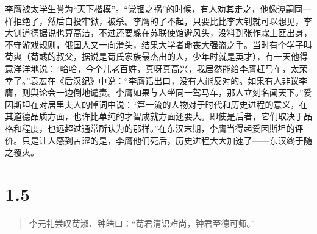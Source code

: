 \documentclass[]{book}
\begin{document}
李膺被太学生誉为``天下楷模''。``党锢之祸''的时候，有人劝其走之，他像谭嗣同一样拒绝了，然后自投牢狱，被杀。李膺的了不起，只要比比李大钊就可以想见，李大钊道德据说也算高洁，不过还要躲在苏联使馆避风头，没料到张作霖土匪出身，不守游戏规则，俄国人又一向滑头，结果大学者命丧大强盗之手。当时有个学子叫荀爽（荀彧的叔父，据说是荀氏家族最杰出的人，少年时就是英才），有一天他得意洋洋地说：``哈哈，今个儿老百姓，真呀真高兴，我居然能给李膺赶马车，太荣幸了。''袁宏在《后汉纪》中说：``李膺话出口，没有人能反对的。如果有人非议李膺，则舆论会一边倒地谴责。李膺如果与人坐同一驾马车，那人立刻名闻天下。''爱因斯坦在对居里夫人的悼词中说：``第一流的人物对于时代和历史进程的意义，在其道德品质方面，也许比单纯的才智成就方面还要大。即使是后者，它们取决于品格和程度，也远超过通常所认为的那样。''在东汉末期，李膺当得起爱因斯坦的评价。只是让人感到苦涩的是，李膺他们死后，历史进程大大加速了------东汉终于随之覆灭。

\section{1.5}\label{section-4}

\begin{quote}
李元礼尝叹荀淑、钟皓曰：``荀君清识难尚，钟君至德可师。''
\end{quote}
\end{document}
